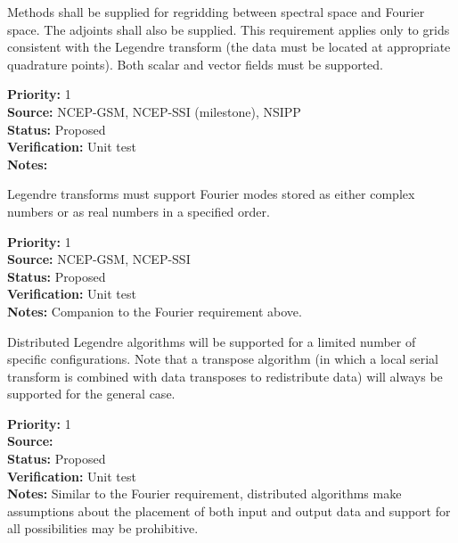 
Methods shall be supplied for regridding between spectral space and
Fourier space.  The adjoints shall also be supplied.  This requirement
applies only to grids consistent with the Legendre transform (the
data must be located at appropriate quadrature points).
Both scalar and vector fields must be supported.

\begin{reqlist}
{\bf Priority:} 1 \\
{\bf Source:}  NCEP-GSM, NCEP-SSI (milestone), NSIPP \\
{\bf Status:} Proposed \\
{\bf Verification:} Unit test \\
{\bf Notes:}
\end{reqlist}


Legendre transforms must support Fourier modes stored as either
complex numbers or as real numbers in a specified order.

\begin{reqlist}
{\bf Priority:} 1 \\
{\bf Source:}  NCEP-GSM, NCEP-SSI \\
{\bf Status:} Proposed \\
{\bf Verification:} Unit test \\
{\bf Notes:}  Companion to the Fourier requirement above.
\end{reqlist}


Distributed Legendre algorithms will be supported for a limited
number of specific configurations.  Note that a transpose
algorithm (in which a local serial transform is combined
with data transposes to redistribute data) will always
be supported for the general case.

\begin{reqlist}
{\bf Priority:} 1 \\
{\bf Source:}  \\
{\bf Status:} Proposed \\
{\bf Verification:} Unit test \\
{\bf Notes:} Similar to the Fourier requirement,
             distributed algorithms make assumptions about
             the placement of both input and output data and
             support for all possibilities may be prohibitive.
\end{reqlist}

